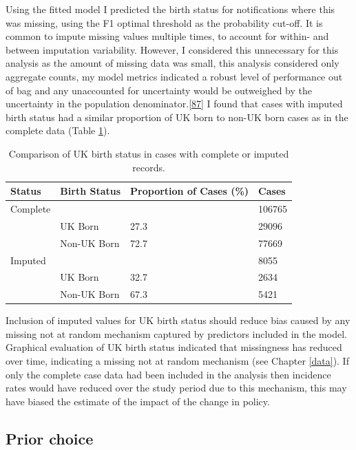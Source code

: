 \documentclass[11pt,twoside]{bristolthesis}
\begin{document}
  Using the fitted model I predicted the birth status for notifications where this was missing, using the F1 optimal threshold as the probability cut-off. It is common to impute missing values multiple times, to account for within- and between imputation variability. However, I considered this unnecessary for this analysis as the amount of missing data was small, this analysis considered only aggregate counts, my model metrics indicated a robust level of performance out of bag and any unaccounted for uncertainty would be outweighed by the uncertainty in the population denominator.{[}\protect\hyperlink{ref-Thomas2018}{87}{]} I found that cases with imputed birth status had a similar proportion of UK born to non-UK born cases as in the complete data (Table \ref{tab:07-imp-com}).
  \begin{table}[!h]
  
  \caption{\label{tab:07-imp-com}Comparison of UK birth status in cases with complete or imputed records.}
  \centering
  \begin{tabular}{llll}
  \toprule
  Status & Birth Status & Proportion of Cases (\%) & Cases\\
  \midrule
  Complete &  &  & 106765\\
   & UK Born & 27.3 & 29096\\
   & Non-UK Born & 72.7 & 77669\\
  Imputed &  &  & 8055\\
   & UK Born & 32.7 & 2634\\
  \addlinespace
   & Non-UK Born & 67.3 & 5421\\
  \bottomrule
  \end{tabular}
  \end{table}
  Inclusion of imputed values for UK birth status should reduce bias caused by any missing not at random mechanism captured by predictors included in the model. Graphical evaluation of UK birth status indicated that missingness has reduced over time, indicating a missing not at random mechanism (see Chapter \ref{data}). If only the complete case data had been included in the analysis then incidence rates would have reduced over the study period due to this mechanism, this may have biased the estimate of the impact of the change in policy.
  
  \hypertarget{prior-choice}{%
  \subsection{Prior choice}\label{prior-choice}}
  
\end{document}
